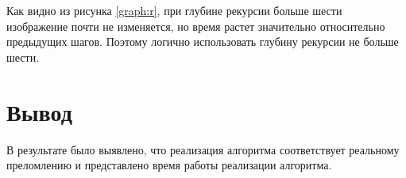 Как видно из рисунка \ref{graph:r}, при глубине рекурсии больше шести изображение почти не изменяется, но время растет значительно относительно предыдущих шагов. Поэтому логично использовать глубину рекурсии не больше шести. 

\section{Вывод}

В результате было выявлено, что реализация алгоритма соответствует реальному преломлению и представлено время работы реализации алгоритма.